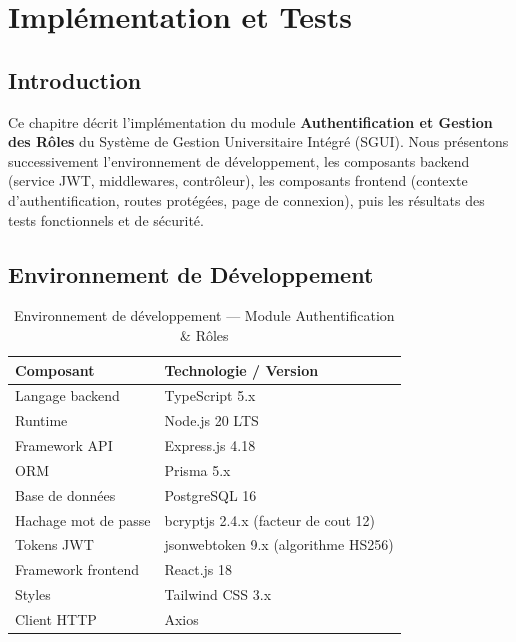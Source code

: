 \documentclass[12pt,a4paper,oneside]{report}
\begin{document}

\setcounter{chapter}{2}   %

\chapter{Implémentation et Tests}

\section{Introduction}

Ce chapitre décrit l'implémentation du module \textbf{Authentification et
Gestion des Rôles} du Système de Gestion Universitaire Intégré (SGUI). Nous
présentons successivement l'environnement de développement, les composants
backend (service JWT, middlewares, contrôleur), les composants frontend
(contexte d'authentification, routes protégées, page de connexion), puis les
résultats des tests fonctionnels et de sécurité.

\section{Environnement de Développement}

\begin{table}[H]
\centering
\caption{Environnement de développement — Module Authentification \& Rôles}
\begin{tabular}{@{}ll@{}}
\toprule
\textbf{Composant}        & \textbf{Technologie / Version}          \\
\midrule
Langage backend           & TypeScript 5.x                          \\
Runtime                   & Node.js 20 LTS                          \\
Framework API             & Express.js 4.18                         \\
ORM                       & Prisma 5.x                              \\
Base de données           & PostgreSQL 16                           \\
Hachage mot de passe      & bcryptjs 2.4.x (facteur de cout 12)     \\
Tokens JWT                & jsonwebtoken 9.x (algorithme HS256)     \\
Framework frontend        & React.js 18                             \\
Styles                    & Tailwind CSS 3.x                        \\
Client HTTP               & Axios                                   \\
\bottomrule
\end{tabular}
\end{table}
\end{document}

